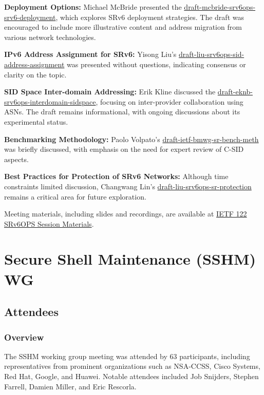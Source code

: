 \documentclass{article}
\begin{document}
\textbf{Deployment Options:} Michael McBride presented the \href{https://datatracker.ietf.org/doc/html/draft-mcbride-srv6ops-srv6-deployment}{draft-mcbride-srv6ops-srv6-deployment}, which explores SRv6 deployment strategies. The draft was encouraged to include more illustrative content and address migration from various network technologies.

\textbf{IPv6 Address Assignment for SRv6:} Yisong Liu's \href{https://datatracker.ietf.org/doc/html/draft-liu-srv6ops-sid-address-assignment}{draft-liu-srv6ops-sid-address-assignment} was presented without questions, indicating consensus or clarity on the topic.

\textbf{SID Space Inter-domain Addressing:} Erik Kline discussed the \href{https://datatracker.ietf.org/doc/html/draft-eknb-srv6ops-interdomain-sidspace}{draft-eknb-srv6ops-interdomain-sidspace}, focusing on inter-provider collaboration using ASNs. The draft remains informational, with ongoing discussions about its experimental status.

\textbf{Benchmarking Methodology:} Paolo Volpato's \href{https://datatracker.ietf.org/doc/html/draft-ietf-bmwg-sr-bench-meth}{draft-ietf-bmwg-sr-bench-meth} was briefly discussed, with emphasis on the need for expert review of C-SID aspects.

\textbf{Best Practices for Protection of SRv6 Networks:} Although time constraints limited discussion, Changwang Lin's \href{https://datatracker.ietf.org/doc/html/draft-liu-srv6ops-sr-protection}{draft-liu-srv6ops-sr-protection} remains a critical area for future exploration.

Meeting materials, including slides and recordings, are available at \href{https://datatracker.ietf.org/meeting/122/session/srv6ops}{IETF 122 SRv6OPS Session Materials}.




\newpage

\section{Secure Shell Maintenance (SSHM) WG}

\subsection{Attendees}
\subsubsection{Overview}
The SSHM working group meeting was attended by 63 participants, including representatives from prominent organizations such as NSA-CCSS, Cisco Systems, Red Hat, Google, and Huawei. Notable attendees included Job Snijders, Stephen Farrell, Damien Miller, and Eric Rescorla.
\end{document}
